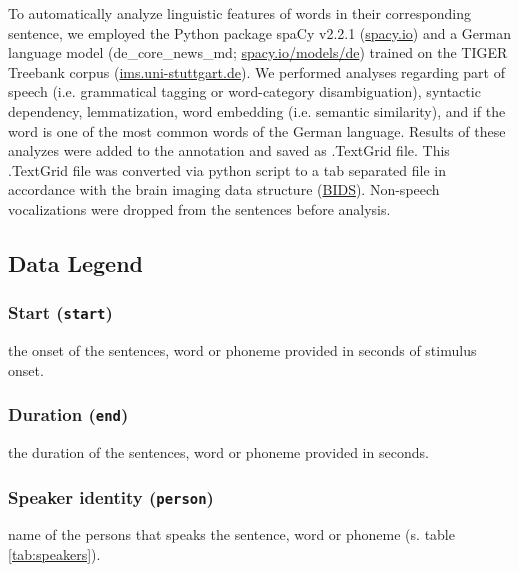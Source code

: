 \documentclass[10pt,a4paper,onecolumn]{article}
\begin{document}
To automatically analyze linguistic features of words in their corresponding
sentence, we employed the Python package spaCy v2.2.1
(\href{https://spacy.io}{spacy.io}) and a German language model
(de\_core\_news\_md; \href{https://spacy.io/models/de}{spacy.io/models/de})
trained on the TIGER Treebank corpus
(\href{https://www.ims.uni-stuttgart.de}{ims.uni-stuttgart.de}). We performed
analyses regarding part of speech (i.e. grammatical tagging or word-category
disambiguation), syntactic dependency, lemmatization, word embedding (i.e.
semantic similarity), and if the word is one of the most common words of the
German language. Results of these analyzes were added to the annotation and
saved as .TextGrid file. This .TextGrid file was converted via python script to
a tab separated file in accordance with the brain imaging data structure
(\href{https://bids.neuroimaging.io/}{BIDS}\citep{gorgolewski2016bids}). Non-speech vocalizations were dropped from the sentences before analysis.

\subsection*{Data Legend}

\subsubsection*{Start (\texttt{start})}
the onset of the sentences, word or phoneme provided in seconds of stimulus onset.

\subsubsection*{Duration (\texttt{end})}
the duration of the sentences, word or phoneme provided in seconds.

\subsubsection*{Speaker identity (\texttt{person})}
name of the persons that speaks the sentence, word or phoneme (s. table \ref{tab:speakers}).

\end{document}
